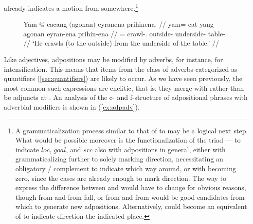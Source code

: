 already indicates a motion from somewhere.\footnote{A grammaticalization
process similar to that of  to
 may be a logical next step. What would be possible
moreover is the functionalization of the triad \Loc{}--\Dat{}--\Gen{} to
indicate $loc$, $goal$, and $src$ also with adpositions in general, either with
 grammaticalizing further to solely marking direction,
necessitating an obligatory \Dat{}/\Gen{} complement to indicate which way
around, or with  becoming zero, since the cases are already
enough to mark direction.
%
%
The way to express the difference between  and 
would have to change for obvious reasons, though  from 
 and  from 
{fall}, or  from  and
 from  would be good candidates
from which to generate new adpositions. Alternatively,  could
become an equivalent of  to indicate direction  the
indicated place.
%
%
}

\begin{figure}[h]
\ex\label{ex:nostackprep}\begingl
	\gla Yam @ cacang $($agonan$)$ eyranena prihinena. //
	\glb yam= cat-yang agonan eyran-ena prihin-ena //
	\glc \DatT{}= crawl-\TsgM{}.\Aarg{} outside-\Top{} underside-\Gen{}
		table-\Gen{} //
	\glft `He crawls (to the outside) from the underside of the table.' //
\endgl\xe
\end{figure}

Like adjectives, adpositions may be modified by adverbs, for instance, for
intensification. This means that items from the class of adverbs categorized as
quantifiers (\autoref{sec:quantifiers}) are likely to occur. As we have seen
previously, the most common such expressions are enclitic, that is, they merge
with  rather than be adjuncts at . An analysis of the c- and
f-structure of adpositional phrases with adverbial modifiers is shown in 
(\ref{ex:adpadv}).

